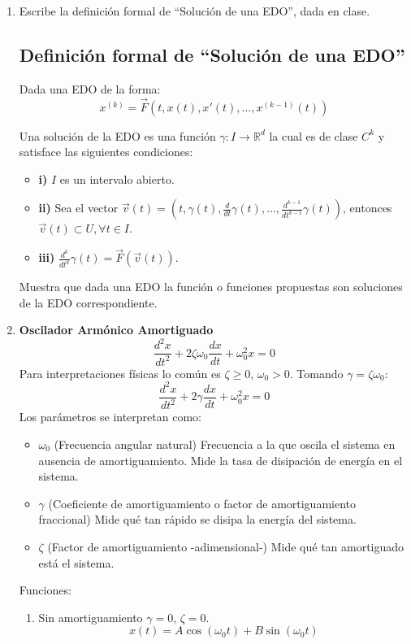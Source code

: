 \begin{enumerate}[label=\arabic*., leftmargin=*]
    \item Escribe la definición formal de ``Solución de una EDO'', dada en clase.
    
    \subsection{Definición formal de ``Solución de una EDO''}

    Dada una EDO de la forma:
    \[ x^{(k)} = \vec{F}(t, x(t), x'(t), \dots, x^{(k-1)}(t)) \]

    Una solución de la EDO es una función $\gamma : I \to \mathbb{R}^d$ la cual es de clase $C^k$ y satisface las siguientes condiciones:

    \begin{itemize}[leftmargin=*]
        \item \textbf{i)} $I$ es un intervalo abierto.
        \item \textbf{ii)} Sea el vector $\vec{v}(t) = \left(t, \gamma(t), \frac{d}{dt}\gamma(t), \dots, \frac{d^{k-1}}{dt^{k-1}}\gamma(t)\right)$, entonces $\vec{v}(t) \subset U, \forall t \in I$.
        \item \textbf{iii)} $\frac{d^k}{dt^k}\gamma(t) = \vec{F}(\vec{v}(t))$.
    \end{itemize}
    
    Muestra que dada una EDO la función o funciones propuestas son soluciones de la EDO correspondiente.
    \item \textbf{Oscilador Armónico Amortiguado}
    \[ \frac{d^{2}x}{dt^{2}}+2\zeta\omega_{0}\frac{dx}{dt}+\omega_{0}^{2}x=0 \]
    Para interpretaciones físicas lo común es $\zeta\ge0$, $\omega_{0}>0$. Tomando $\gamma=\zeta\omega_{0}$:
    \[ \frac{d^{2}x}{dt^{2}}+2\gamma\frac{dx}{dt}+\omega_{0}^{2}x=0 \]
    Los parámetros se interpretan como:
    \begin{itemize}[leftmargin=*]
        \item $\omega_0$ (Frecuencia angular natural) Frecuencia a la que oscila el sistema en ausencia de amortiguamiento. Mide la tasa de disipación de energía en el sistema.
        \item $\gamma$ (Coeficiente de amortiguamiento o factor de amortiguamiento fraccional) Mide qué tan rápido se disipa la energía del sistema.
        \item $\zeta$ (Factor de amortiguamiento -adimensional-) Mide qué tan amortiguado está el sistema.
    \end{itemize}
    Funciones:
    \begin{enumerate}[label=(\alph*), leftmargin=*]
        \item Sin amortiguamiento $\gamma=0$, $\zeta=0$.
        \begin{equation*}
            x(t)=A \cos(\omega_{0}t)+B \sin(\omega_{0}t) \tag{1}
        \end{equation*}


\end{enumerate}
\end{enumerate}
